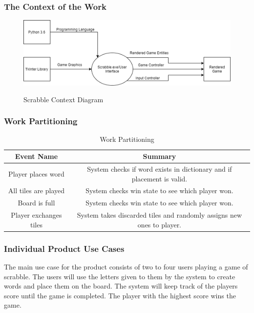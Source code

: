 \documentclass[12pt, titlepage]{article}
\begin{document}
\subsubsection{The Context of the Work} %
%
\begin{figure}[ht]
\centering
\includegraphics{srs_context_of_work.png}\\
\caption{Scrabble Context Diagram}
\end{figure}
\subsubsection{Work Partitioning} %
%

\begin{table}[!htb]
    \centering
    \caption{Work Partitioning}
    \begin{tabular}{|c|c|}
        \hline
        Event Name & Summary \\
        \hline
        Player places word & System checks if word exists in dictionary and if placement is valid.\\
        All tiles are played & System checks win state to see which player won. \\  
        Board is full & System checks win state to see which player won. \\
        Player exchanges tiles & System takes discarded tiles and randomly assigns new ones to player. \\
        \hline
    \end{tabular}
\end{table}

\subsubsection{Individual Product Use Cases}%
The main use case for the product consists of two to four users playing a game of scrabble. The users will use the letters given to them by the system to create words and place them on the board. The system will keep track of the players score until the game is completed. The player with the highest score wins the game.
\end{document}
